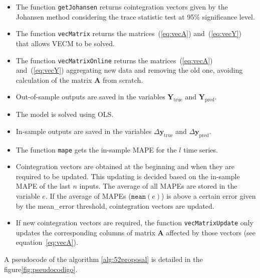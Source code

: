 \begin{itemize}
\item The function \texttt{getJohansen} returns cointegration vectors given by
the Johansen method considering the trace statistic test at 95\%
significance level.
\item The function \texttt{vecMatrix} returns the matrices~(\ref{eq:vecA})
and~(\ref{eq:vecY}) that allows VECM to be solved.
\item The function \texttt{vecMatrixOnline} returns the
matrices~(\ref{eq:vecA}) and~(\ref{eq:vecY}) aggregating new data and removing
the old one, avoiding calculation of the matrix $\mathbf{A}$ from scratch.
\item Out-of-sample outputs are saved in the variables 
$\mathbf{Y}_{\text{true}}$ and $\mathbf{Y}_{\text{pred}}$.
\item The model is solved using OLS.
\item In-sample outputs are saved in the variables $\Delta
\mathbf{y}_{\text{true}}$ and $\Delta \mathbf{y}_{\text{pred}}$.
\item The function \texttt{mape} gets the in-sample MAPE for the $l$ time
series.
\item Cointegration vectors are obtained at the beginning and when they are required to be updated. This updating is decided based on the in-sample MAPE of the last $n$ inputs. The average of all
MAPEs are stored in the variable $e$. If the average of MAPEs
($\texttt{mean}(e)$) is above a certain error given by the mean\_error threshold, cointegration vectors are updated.
\item If new cointegration vectors are required, the function
\texttt{vecMatrixUpdate} only updates the corresponding columns of matrix
$\mathbf{A}$ affected by those vectors (see equation~\ref{eq:vecA}).
\end{itemize}
\newpage

A pseudocode of the algorithm \ref{alg:52proposal} is detailed in the figure\ref{fig:pseudocodigo}.
\newline


